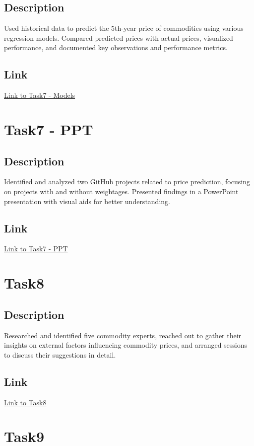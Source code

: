 \documentclass[12pt]{article}
\begin{document}
\subsection{Description}
Used historical data to predict the 5th-year price of commodities using various regression models. Compared predicted prices with actual prices, visualized performance, and documented key observations and performance metrics.

\subsection{Link}
\href{https://github.com/msaadg/PAR-Project/tree/main/Task7%20-%20Article}{Link to Task7 - Models}

\section{Task7 - PPT}
\subsection{Description}
Identified and analyzed two GitHub projects related to price prediction, focusing on projects with and without weightages. Presented findings in a PowerPoint presentation with visual aids for better understanding.

\subsection{Link}
\href{https://github.com/msaadg/PAR-Project/tree/main/Task7%20-%20PPT}{Link to Task7 - PPT}

\section{Task8}
\subsection{Description}
Researched and identified five commodity experts, reached out to gather their insights on external factors influencing commodity prices, and arranged sessions to discuss their suggestions in detail.

\subsection{Link}
\href{https://github.com/msaadg/PAR-Project/tree/main/Task8}{Link to Task8}

\section{Task9}
\end{document}
